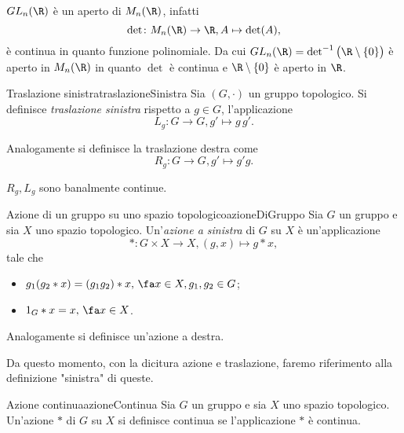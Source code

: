 \begin{oss}
	\(GL_n(\R)\) è un aperto di \(M_n(\R)\), infatti
	\[
		\det\colon M_n(\R) \to \R, A \mapsto \det(A),
	\]
	è continua in quanto funzione polinomiale.
	Da cui \(GL_n(\R)=\det^{-1}\big(\R\setminus\{0\}\big)\) è aperto in \(M_n(\R)\) in quanto \(\det\) è continua e \(\R\setminus\{0\}\) è aperto in \(\R\).
\end{oss}

\begin{defn}{Traslazione sinistra}{traslazioneSinistra}
	Sia \((G,\cdot)\) un gruppo topologico.
	Si definisce \emph{traslazione sinistra} rispetto a \(g\in G\), l'applicazione
	\[
		L_g \colon G\to G, g'\mapsto g\,g'.
	\]
\end{defn}

\begin{oss}
	Analogamente si definisce la traslazione destra come
	\[
		R_g \colon G \to G, g'\mapsto g' g.
	\]
\end{oss}

\begin{oss}
	\(R_g,L_g\) sono banalmente continue.
\end{oss}

\begin{defn}{Azione di un gruppo su uno spazio topologico}{azioneDiGruppo}
	Sia \(G\) un gruppo e sia \(X\) uno spazio topologico.
	Un'\emph{azione a sinistra} di \(G\) su \(X\) è un'applicazione
	\[
		*\colon G \times X \to X, (g,x) \mapsto g*x,
	\]
	tale che
	\begin{itemize}
		\item \(g_1(g_2*x)=(g_1 g_2)*x,\,\fa x\in X, g_1,g_2 \in G\);
		\item \(1_G * x=x,\,\fa x \in X\).
	\end{itemize}
\end{defn}

\begin{oss}
	Analogamente si definisce un'azione a destra.
\end{oss}

\begin{notz}
	Da questo momento, con la dicitura azione e traslazione, faremo riferimento alla definizione "sinistra" di queste.
\end{notz}

\begin{defn}{Azione continua}{azioneContinua}
	Sia \(G\) un gruppo e sia \(X\) uno spazio topologico.
	Un'azione \(*\) di \(G\) su \(X\) si definisce continua se l'applicazione \(*\) è continua.
\end{defn}

